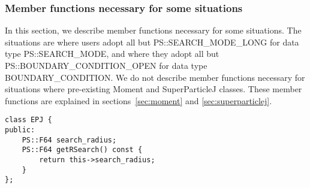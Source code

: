 \subsubsection{Member functions necessary for some situations}


In this section, we describe member functions necessary for some
situations. The situations are where users adopt all but
PS::SEARCH\_MODE\_LONG for data type PS::SEARCH\_MODE, and where they
adopt all but PS::BOUNDARY\_CONDITION\_OPEN for data type
BOUNDARY\_CONDITION. We do not describe member functions necessary for
situations where pre-existing Moment and SuperParticleJ classes. These
member functions are explained in sections~\ref{sec:moment} and
\ref{sec:superparticlej}.



\begin{screen}
\begin{verbatim}
class EPJ {
public:
    PS::F64 search_radius;
    PS::F64 getRSearch() const {
        return this->search_radius;
    }
};
\end{verbatim}
\end{screen}

